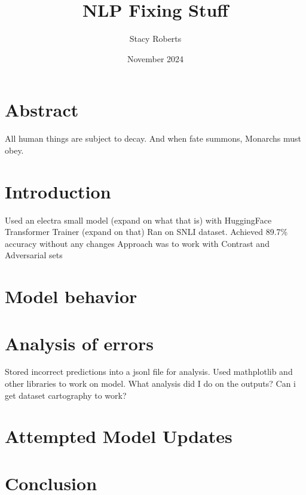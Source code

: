 \documentclass{article}
\title{NLP Fixing Stuff}
\author{Stacy Roberts}
\date{November 2024}
\begin{document}
\maketitle

\begin{multicols*}{2}

\section*{Abstract}
All human things are subject to decay. And when fate summons, Monarchs must obey.

\section*{Introduction}

Used an electra small model (expand on what that is) with HuggingFace Transformer Trainer (expand on that)
Ran on SNLI dataset. Achieved 89.7\% accuracy without any changes
Approach was to work with Contrast and Adversarial sets

\section*{Model behavior}

\section*{Analysis of errors}

Stored incorrect predictions into a jsonl file for analysis. Used mathplotlib and other libraries to work on model.
What analysis did I do on the outputs? Can i get dataset cartography to work?
\section*{Attempted Model Updates}

\section*{Conclusion}



\end{multicols*}
\end{document}
